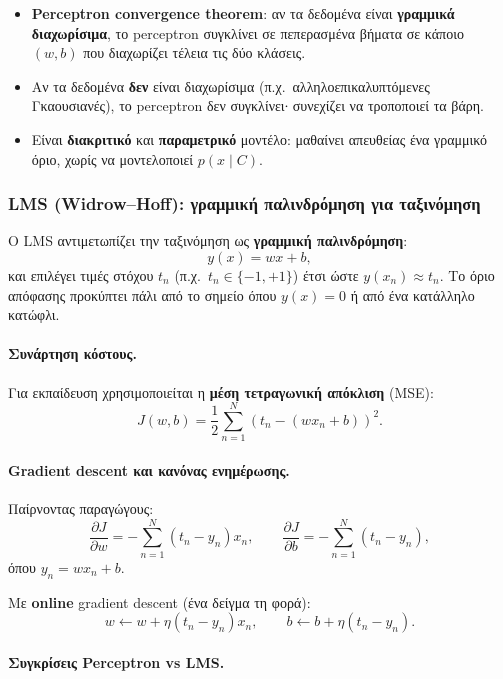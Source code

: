 \documentclass[a4paper,11pt]{article}
\begin{document}
\begin{itemize}
  \item \textbf{Perceptron convergence theorem}: αν τα δεδομένα είναι
        \textbf{γραμμικά διαχωρίσιμα}, το perceptron συγκλίνει σε πεπερασμένα βήματα
        σε κάποιο $(w,b)$ που διαχωρίζει τέλεια τις δύο κλάσεις.
  \item Αν τα δεδομένα \textbf{δεν} είναι διαχωρίσιμα (π.χ.\ αλληλοεπικαλυπτόμενες Γκαουσιανές),
        το perceptron δεν συγκλίνει∙ συνεχίζει να τροποποιεί τα βάρη.
  \item Είναι \textbf{διακριτικό} και \textbf{παραμετρικό} μοντέλο:
        μαθαίνει απευθείας ένα γραμμικό όριο, χωρίς να μοντελοποιεί $p(x\mid C)$.
\end{itemize}

\subsubsection*{LMS (Widrow–Hoff): γραμμική παλινδρόμηση για ταξινόμηση}

Ο LMS αντιμετωπίζει την ταξινόμηση ως \textbf{γραμμική παλινδρόμηση}:
\[
y(x) = w x + b,
\]
και επιλέγει τιμές στόχου $t_n$ (π.χ.\ $t_n\in\{-1,+1\}$) έτσι ώστε
$y(x_n)\approx t_n$. Το όριο απόφασης προκύπτει πάλι από το σημείο όπου
$y(x)=0$ ή από ένα κατάλληλο κατώφλι.

\paragraph{Συνάρτηση κόστους.}

Για εκπαίδευση χρησιμοποιείται η \textbf{μέση τετραγωνική απόκλιση} (MSE):
\[
J(w,b) = \frac{1}{2}\sum_{n=1}^N (t_n - (w x_n + b))^2.
\]

\paragraph{Gradient descent και κανόνας ενημέρωσης.}

Παίρνοντας παραγώγους:
\[
\frac{\partial J}{\partial w}
= -\sum_{n=1}^N (t_n - y_n) x_n,\qquad
\frac{\partial J}{\partial b}
= -\sum_{n=1}^N (t_n - y_n),
\]
όπου $y_n = w x_n + b$.

Με \textbf{online} gradient descent (ένα δείγμα τη φορά):
\[
w \leftarrow w + \eta (t_n - y_n) x_n, \qquad
b \leftarrow b + \eta (t_n - y_n).
\]

\paragraph{Συγκρίσεις Perceptron vs LMS.}
\end{document}
